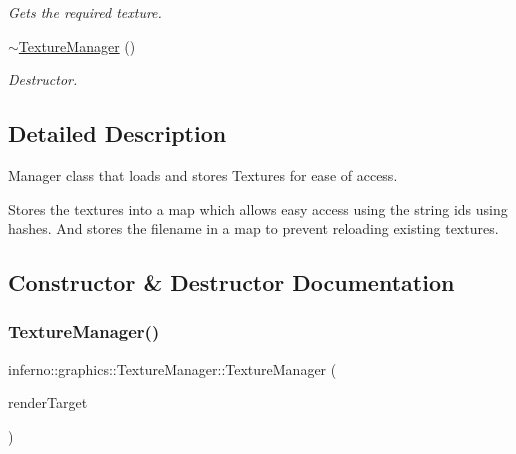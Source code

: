 \begin{DoxyCompactItemize}
\begin{DoxyCompactList}\small\item\em Gets the required texture. \end{DoxyCompactList}\item 
\mbox{\label{classinferno_1_1graphics_1_1_texture_manager_a41c136bc37abea48c23ed8f6c863b63f}} 
\mbox{\hyperlink{classinferno_1_1graphics_1_1_texture_manager_a41c136bc37abea48c23ed8f6c863b63f}{$\sim$\+Texture\+Manager}} ()
\begin{DoxyCompactList}\small\item\em Destructor. \end{DoxyCompactList}\end{DoxyCompactItemize}


\subsection{Detailed Description}
Manager class that loads and stores Textures for ease of access. 

Stores the textures into a map which allows easy access using the string ids using hashes. And stores the filename in a map to prevent reloading existing textures. 

\subsection{Constructor \& Destructor Documentation}
\mbox{\label{classinferno_1_1graphics_1_1_texture_manager_a06e141712b3786bae5100da3e04aff92}} 
\subsubsection{\texorpdfstring{Texture\+Manager()}{TextureManager()}\hspace{0.1cm}{\footnotesize\ttfamily [1/3]}}
{\footnotesize\ttfamily inferno\+::graphics\+::\+Texture\+Manager\+::\+Texture\+Manager (\begin{DoxyParamCaption}\item[{S\+D\+L\+\_\+\+Renderer $\ast$}]{render\+Target }\end{DoxyParamCaption})\hspace{0.3cm}{\ttfamily [inline]}}




